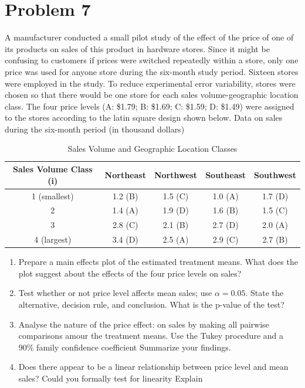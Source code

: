 \documentclass{article}
\begin{document}
\section{Problem 7}
A manufacturer conducted a small pilot study of the effect of the price of one of its products on
sales of this product in hardware stores. Since it might be confusing to customers if prices were
switched repeatedly within a store, only one price was used for anyone store during the six-month
study period. Sixteen stores were employed in the study. To reduce experimental error variability,
stores were chosen so that there would be one store for each sales volume-geographic location class.
The four price levels (A: \$1.79; B: \$1.69; C: \$1.59; D: \$1.49) were assigned to the stores according
to the latin square design shown below. Data on sales during the six-month period (in thousand
dollars)

\begin{table}[!ht]
	\centering
	\caption{Sales Volume and Geographic Location Classes}
	\begin{tabular}{c c c c c}
		\hline
		\textbf{Sales Volume Class (i)} & \textbf{Northeast} & \textbf{Northwest} & \textbf{Southeast} & \textbf{Southwest} \\
		\hline
		1 (smallest)                    & 1.2 (B)            & 1.5 (C)            & 1.0 (A)            & 1.7 (D)            \\
		2                               & 1.4 (A)            & 1.9 (D)            & 1.6 (B)            & 1.5 (C)            \\
		3                               & 2.8 (C)            & 2.1 (B)            & 2.7 (D)            & 2.0 (A)            \\
		4 (largest)                     & 3.4 (D)            & 2.5 (A)            & 2.9 (C)            & 2.7 (B)            \\
		\hline
	\end{tabular}
\end{table}


\begin{enumerate}
	\item Prepare a main effects plot of the estimated treatment means. What does the plot suggest about the effects of the
	      four price levels on sales?
	\item Test whether or not price level affects mean sales; use $\alpha = 0.05$. State the alternative,
	      decision rule, and conclusion. What is the p-value of the test?
	\item Analyse the nature of the price effect: on sales by making all pairwise comparisons amour the treatment means.
	      Use the Tukey procedure and a 90\% family confidence coefficient Summarize your findings.
	\item Does there appear to be a linear relationship between price level and mean sales? Could you formally test for linearity
	      Explain
\end{enumerate}
\end{document}
